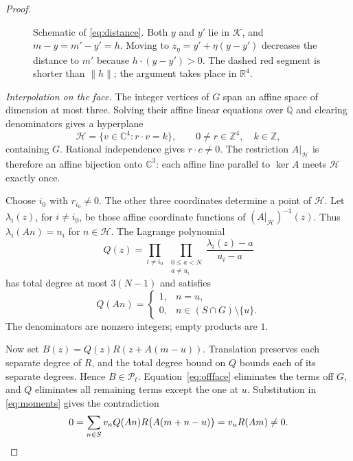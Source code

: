 \documentclass[11pt,a4paper]{amsart}
\theoremstyle{remark}
\newcommand{\Q}{\mathbb Q}
\newcommand{\Z}{\mathbb Z}
\newcommand{\C}{\mathbb C}
\newcommand{\R}{\mathbb R}
\newcommand{\cP}{\mathcal P}
\newcommand{\cK}{\mathcal K}
\numberwithin{equation}{section}
\begin{document}
\begin{proof}
\begin{figure}[ht]
\centering
{}
\caption{Schematic of \eqref{eq:distance}. Both $y$ and $y'$ lie in
$\cK$, and $m-y=m'-y'=h$. Moving to $z_\eta=y'+\eta(y-y')$ decreases the
distance to $m'$ because $h\cdot(y-y')>0$. The dashed red segment is
shorter than $\|h\|$; the argument takes place in $\R^4$.}
\label{fig:nearest}
\end{figure}

\smallskip\noindent
\emph{Interpolation on the face.}
The integer vertices of $G$ span an affine space of dimension at most
three. Solving their affine linear equations over $\Q$ and clearing
denominators gives a hyperplane
\[
 \mathcal H=\{v\in\C^4:r\cdot v=k\},
 \qquad 0\ne r\in\Z^4,\quad k\in\Z,
\]
containing $G$. Rational independence gives $r\cdot c\ne0$.
The restriction $A|_{\mathcal H}$ is therefore an affine bijection
onto $\C^3$: each affine line parallel to $\ker A$ meets
$\mathcal H$ exactly once.

Choose $i_0$ with $r_{i_0}\ne0$. The other three coordinates
determine a point of $\mathcal H$. Let $\lambda_i(z)$, for
$i\ne i_0$, be those affine coordinate functions of
$(A|_{\mathcal H})^{-1}(z)$. Thus $\lambda_i(An)=n_i$ for
$n\in\mathcal H$. The Lagrange polynomial
\[
 Q(z)=\prod_{i\ne i_0}\ \prod_{\substack{0\le a<N\\a\ne u_i}}
             \frac{\lambda_i(z)-a}{u_i-a}
\]
has total degree at most $3(N-1)$ and satisfies
\[
 Q(An)=\begin{cases}1,&n=u,\\0,&n\in(S\cap G)\setminus\{u\}.
 \end{cases}
\]
The denominators are nonzero integers; empty products are $1$.

Now set $B(z)=Q(z)R(z+A(m-u))$. Translation preserves each separate
degree of $R$, and the total degree bound on $Q$ bounds each of its
separate degrees. Hence $B\in\cP_t$. Equation~\eqref{eq:offface}
eliminates the terms off $G$, and $Q$ eliminates all remaining terms
except the one at $u$. Substitution in \eqref{eq:moments} gives
the contradiction
\[
 0=\sum_{n\in S}v_nQ(An)R\bigl(A(m+n-u)\bigr)
   =v_uR(Am)\ne0.\qedhere
\]
\end{proof}
\end{document}
